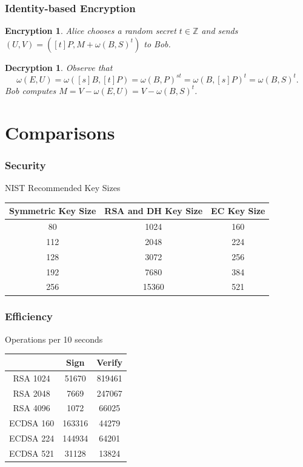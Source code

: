 \documentclass{beamer}
\newtheorem{encryption}{Encryption}
\newtheorem{decryption}{Decryption}
\begin{document}
    \begin{frame}
        \frametitle{Identity-based Encryption}
        \begin{encryption}
            Alice chooses a random secret \(t \in \mathbb{Z}\) and sends
            \((U, V) = ([t]P, M + \omega(B, S)^t)\) to Bob.
        \end{encryption}
        \vfill
        \begin{decryption}
            Observe that \[\omega(E, U) = \omega([s]B, [t]P) =
            \omega(B, P)^{st} = \omega(B, [s]P)^t = \omega(B, S)^t.\]
            Bob computes \(M = V - \omega(E, U) = V - \omega(B, S)^t\).
        \end{decryption}
    \end{frame}



    \section{Comparisons}
    \begin{frame}
        \frametitle{Security}
        \centering
        NIST Recommended Key Sizes\\
        \vspace{.5cm}
        \begin{tabular}{c c c}
            Symmetric Key Size & RSA and DH Key Size & EC Key Size \\ \hline
            80 & 1024 & 160 \\
            112 & 2048 & 224 \\
            128 & 3072 & 256 \\
            192 & 7680 & 384 \\
            256 & 15360 & 521 \\
        \end{tabular}
    \end{frame}

    \begin{frame}
        \frametitle{Efficiency}
        \centering
        Operations per 10 seconds \\
        \vspace{.5cm}
        \begin{tabular}{c|c c}
             & Sign & Verify \\ \hline \hline
            RSA 1024 & 51670 & 819461 \\
            RSA 2048 & 7669 & 247067 \\
            RSA 4096 & 1072 & 66025 \\
            \hline
            ECDSA 160 & 163316 & 44279 \\
            ECDSA 224 & 144934 & 64201 \\
            ECDSA 521 & 31128 & 13824 \\
        \end{tabular}
    \end{frame}
\end{document}
